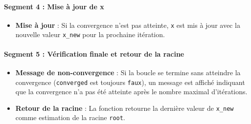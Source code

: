 \documentclass{article}
\begin{document}
\paragraph{Segment 4 : Mise à jour de x}
\begin{itemize}
    \item \textbf{Mise à jour} : Si la convergence n'est pas atteinte, \texttt{x} est mis à jour avec la nouvelle valeur \texttt{x\_new} pour la prochaine itération.
\end{itemize}

\paragraph{Segment 5 : Vérification finale et retour de la racine}
\begin{itemize}
    \item \textbf{Message de non-convergence} : Si la boucle se termine sans atteindre la convergence (\texttt{converged} est toujours \texttt{faux}), un message est affiché indiquant que la convergence n'a pas été atteinte après le nombre maximal d'itérations.
    \item \textbf{Retour de la racine} : La fonction retourne la dernière valeur de \texttt{x\_new} comme estimation de la racine \texttt{root}.
\end{itemize}
\end{document}

